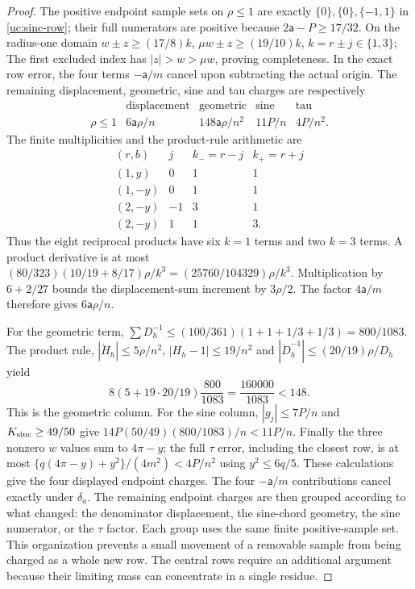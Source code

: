 \begin{proof}
The positive endpoint sample sets on $\rho\leq1$ are exactly
$\{0\},\{0\},\{-1,1\}$ in \eqref{uc:sinc-row}; their full
numerators are positive because $2\mathsf{a}-P\geq17/32$. On the radius-one domain
$w\pm z\geq(17/8)k$, $\mu w\pm z\geq(19/10)k$,
$k=r\pm j\in\{1,3\}$;
The first excluded index has $|z|>w>\mu w$, proving completeness.
In the exact row error, the four terms $-\mathsf{a}/m$ cancel upon subtracting
the actual origin. The remaining displacement, geometric, sine and
tau charges are respectively
\[
\begin{array}{ccccc}
 &\text{displacement}&\text{geometric}&\text{sine}&\text{tau}\\ \hline
\rho\leq1&6\mathsf{a}\rho/n&148\mathsf{a}\rho/n^2&11P/n&4P/n^2.
\end{array}
\]
The finite multiplicities and the product-rule arithmetic are
\[
\begin{array}{cccc}
 (r,b)&j&k_-=r-j&k_+=r+j\\ \hline
 (1,y)&0&1&1\\
 (1,-y)&0&1&1\\
 (2,-y)&-1&3&1\\
 (2,-y)&1&1&3.
\end{array}
\]
Thus the eight reciprocal products have six $k=1$ terms and two
$k=3$ terms. A product derivative is at most
$(80/323)(10/19+8/17)\rho/k^3=(25760/104329)\rho/k^3$.
Multiplication by $6+2/27$ bounds the displacement-sum increment by
$3\rho/2$. The factor $4\mathsf a/m$ therefore gives $6\mathsf a\rho/n$.

For the geometric term,
$\sum D_h^{-1}\leq(100/361)(1+1+1/3+1/3)=800/1083$.
The product rule, $|\dot H_h|\leq5\rho/n^2$,
$|H_h-1|\leq19/n^2$ and
$|\dot D_h^{-1}|\leq(20/19)\rho/D_h$ yield
\[
 8(5+19\cdot20/19)\frac{800}{1083}
       =\frac{160000}{1083}<148.
\]
This is the geometric column. For the sine column, $|g_j|\leq7P/n$
and $K_{\rm sinc}\geq49/50$ give
$14P(50/49)(800/1083)/n<11P/n$.
Finally the three nonzero $w$ values sum to $4\pi-y$; the full
$\tau$ error, including the closest row, is at most
$\{q(4\pi-y)+y^2\}/(4m^2)<4P/n^2$ using $y^2\leq6q/5$.
These calculations give the four displayed endpoint charges.
The four $-\mathsf{a}/m$ contributions cancel exactly under $\delta_a$.
The remaining endpoint charges are then grouped according to what
changed: the denominator displacement, the sine-chord geometry, the
sine numerator, or the $\tau$ factor. Each group uses the same finite
positive-sample set. This organization prevents a small movement of a
removable sample from being charged as a whole new row. The central
rows require an additional argument because their limiting mass can
concentrate in a single residue.


\end{proof}
